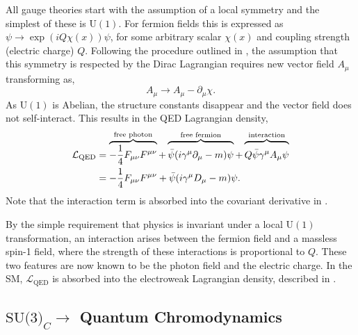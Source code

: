 All gauge theories start with the assumption of a local symmetry and the simplest of these is $\text{U}(1)$.
For fermion fields this is expressed as $\psi \rightarrow \exp{\left(i Q \chi(x)\right)} \psi$, for some arbitrary scalar $\chi(x)$ and coupling strength (electric charge) $Q$.
Following the procedure outlined in , the assumption that this symmetry is respected by the Dirac Lagrangian requires new vector field $A_\mu$ transforming as,
\begin{equation}
	\label{eq:photon_transformation}
	A_\mu \rightarrow A_\mu - \partial_\mu \chi.
\end{equation}
As $\text{U}(1)$ is Abelian, the structure constants disappear and the vector field does not self-interact.
This results in the QED Lagrangian density,
\begin{align}
	\mathcal{L}_\text{QED} & = \overbrace{-\frac{1}{4} F_{\mu\nu} F^{\mu\nu}}^{\text{free photon}}
	+ \overbrace{\vphantom{\frac{1}{1}}\bar \psi (i \gamma^\mu \partial_\mu - m) \psi}^{\text{free fermion}}
	+ \overbrace{\vphantom{\frac{1}{1}}Q \bar \psi \gamma^\mu A_\mu \psi}^{\text{interaction}}               \\
	                       & = -\frac{1}{4} F_{\mu\nu} F^{\mu\nu} + \bar \psi (i \gamma^\mu D_\mu - m) \psi.
	\label{eq:qed_lagrangian}
\end{align}
Note that the interaction term is absorbed into the covariant derivative in .

By the simple requirement that physics is invariant under a local $\text{U}(1)$ transformation, an interaction arises between the fermion field and a massless spin-1 field, where the strength of these interactions is proportional to $Q$.
These two features are now known to be the photon field and the electric charge.
In the SM, $\mathcal{L}_\text{QED}$ is absorbed into the electroweak Lagrangian density, described in .

\subsection{\texorpdfstring{$\text{SU(3)}_C\rightarrow$}{SU(3)-} Quantum Chromodynamics}
\label{sec:qcd}

